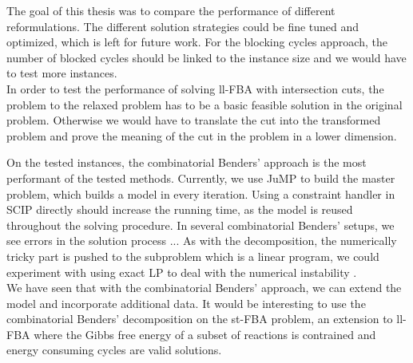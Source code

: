The goal of this thesis was to compare the performance of different reformulations. The different solution strategies could be fine tuned and optimized, which is left for future work. For the blocking cycles approach, the number of blocked cycles should be linked to the instance size and we would have to test more instances. \\ 
In order to test the performance of solving ll-FBA with intersection cuts, the problem to the relaxed problem has to be a basic feasible solution in the original problem. Otherwise we would have to translate the cut into the transformed problem and prove the meaning of the cut in the problem in a lower dimension.  

\thispagestyle{plain}
On the tested instances, the combinatorial Benders' approach is the most performant of the tested methods. Currently, we use \textsf{JuMP} to build the master problem, which builds a model in every iteration. Using a constraint handler in \textsf{SCIP} directly should increase the running time, as the model is reused throughout the solving procedure.  In several combinatorial Benders' setups, we see errors in the solution process ...  As with the decomposition, the numerically tricky part is pushed to the subproblem which is a linear program, we could experiment with using exact LP to deal with the numerical instability \cite{eifler_combining_2023}.
\\ We have seen that with the combinatorial Benders' approach, we can extend the model and incorporate additional data. It would be interesting to use the combinatorial Benders' decomposition on the st-FBA problem, an extension to ll-FBA where the Gibbs free energy of a subset of reactions is contrained and energy consuming cycles are valid solutions.


